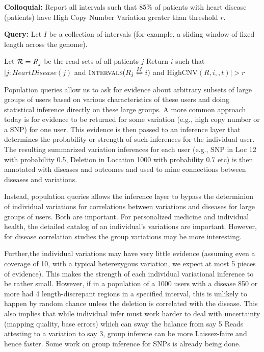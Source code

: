 \documentclass[10pt,fullpage]{article}
\def\ensuretext{\textrm}
\newcommand{\Intervals}{\ensuretext{{\sc Intervals}}}
\newcommand{\MapRel}{\ensuremath{\stackrel{M}{\Leftrightarrow}}}
\begin{document}
{\bf Colloquial:} Report all intervals such that 85\% of
patients with heart disease (patients) have High Copy Number
Variation greater than threshold $r$.

{\bf Query:} Let $I$ be a collection of intervals (for example, a
sliding window of fixed length across the genome).

Let ${\cal R} = {R_j}$ be the read sets of all patients $j$
Return ${i}$ such  that $|j: HeartDisease(j)$ and
$\Intervals(R_j\MapRel i)$ and $\mbox{HighCNV}(R,i,,t)| > r$

Population queries allow us to ask for evidence about arbitrary
subsets of large groups of users based on various characteristics
of these users and doing statistical inference directly on
these large groups.  A more common approach today is for 
evidence to be returned for some variation (e.g., high copy
number or a SNP) for one user.  This evidence is then passed to an
inference layer that determines the probability or strength
of such inferences for the individual user.  The resulting
summarized variation inferences for each user (e.g., SNP in
Loc 12 with probability 0.5, Deletion in Location 1000 with
probability 0.7 etc) is then annotated with diseases and
outcomes and used to mine connections between diseases and
variations.

Instead, population queries allows the inference layer to 
bypass the determinion of individual variations for 
correlations between variations and diseases for large groups
of users.  Both are important.  For personalized medicine
and individual health, the detailed catalog of an individual's
variations are important. However, for disease correlation
studies the group variations may be more interesting.  

Further,the individual variations may have very little evidence 
(assuming even a coverage of 10, with a typical heterezygous
variation, we expect at most 5 pieces of evidence).  This
makes the strength of each individual variational inference
to be rather small.   However, if in a population of a
1000 users with a disease 850 or more had 4 length-discrepant 
regions in 
a specified interval, this is unlikely to happen by random chance
unless the deletion is correlated with the disease.  This
also implies that while individual infer must work harder to
deal with uncertainty (mapping quality, base errors) which 
can sway the balance from say 5 Reads attesting to a variation
to say 3, group inferene can be more Laissez-faire and hence
faster.  Some work on group inference for SNPs is already being
done.
\end{document}
